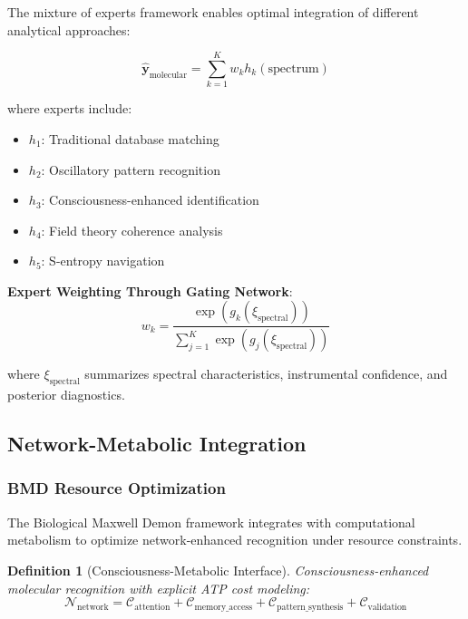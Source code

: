 \documentclass[11pt,a4paper]{article}
\newtheorem{definition}[theorem]{Definition}
\theoremstyle{remark}
\begin{document}
The mixture of experts framework enables optimal integration of different analytical approaches:

\begin{equation}
\hat{\mathbf{y}}_{\text{molecular}} = \sum_{k=1}^{K} w_k h_k(\text{spectrum})
\end{equation}

where experts include:
\begin{itemize}
\item $h_1$: Traditional database matching
\item $h_2$: Oscillatory pattern recognition  
\item $h_3$: Consciousness-enhanced identification
\item $h_4$: Field theory coherence analysis
\item $h_5$: S-entropy navigation
\end{itemize}

\textbf{Expert Weighting Through Gating Network}:
\begin{equation}
w_k = \frac{\exp(g_k(\xi_{\text{spectral}}))}{\sum_{j=1}^{K} \exp(g_j(\xi_{\text{spectral}}))}
\end{equation}

where $\xi_{\text{spectral}}$ summarizes spectral characteristics, instrumental confidence, and posterior diagnostics.

\subsection{Network-Metabolic Integration}

\subsubsection{BMD Resource Optimization}

The Biological Maxwell Demon framework integrates with computational metabolism to optimize network-enhanced recognition under resource constraints.

\begin{definition}[Consciousness-Metabolic Interface]
Consciousness-enhanced molecular recognition with explicit ATP cost modeling:
\begin{equation}
\mathcal{N}_{\text{network}} = \mathcal{C}_{\text{attention}} + \mathcal{C}_{\text{memory\_access}} + \mathcal{C}_{\text{pattern\_synthesis}} + \mathcal{C}_{\text{validation}}
\end{equation}
\end{definition}
\end{document}
